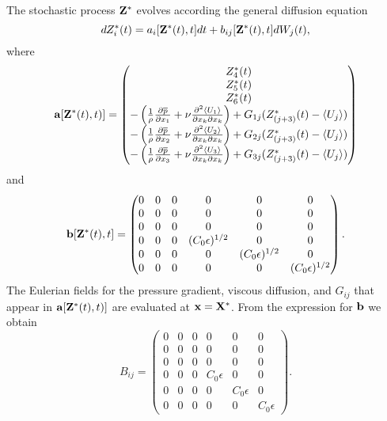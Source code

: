 \documentclass[oneside,a4paper,11pt]{report}
\newcommand{\pavg}{\overline{p}}
\newcommand{\ujavg}{\langle U_j \rangle}
\begin{document}
The stochastic process $\bold{Z}^*$ evolves according the general diffusion equation
\begin{equation}
dZ^*_i(t) = a_i[\bold{Z}^*(t),t] dt + b_{ij}[\bold{Z}^*(t),t] dW_j(t),
\end{equation}
where 
\begin{equation}
\bold{a}[\bold{Z}^*(t),t)] =  \begin{pmatrix}
  Z^*_4(t) \\
  Z^*_5(t)  \\
  Z^*_6(t) \\
-\left ( \frac{1}{\rho} \frac{\partial \pavg}{\partial x_1} + \nu \frac{\partial^2 \langle U_1 \rangle}{\partial x_k \partial x_k} \right ) + G_{1j} (Z_{(j+3)}^*(t) - \ujavg) \\
-\left ( \frac{1}{\rho} \frac{\partial \pavg}{\partial x_2} + \nu \frac{\partial^2 \langle U_2 \rangle}{\partial x_k \partial x_k} \right ) + G_{2j} (Z_{(j+3)}^*(t) - \ujavg) \\
-\left ( \frac{1}{\rho} \frac{\partial \pavg}{\partial x_3} + \nu \frac{\partial^2 \langle U_3 \rangle}{\partial x_k \partial x_k} \right ) + G_{3j} (Z_{(j+3)}^*(t) - \ujavg)
 \end{pmatrix}
\end{equation}
and
\begin{equation}
\mathbf{b}[\bold{Z}^*(t),t] = \begin{pmatrix}
  0 & 0 & 0 & 0 & 0 & 0 \\
  0 & 0 & 0 & 0 & 0 & 0 \\
  0 & 0 & 0 & 0 & 0 & 0 \\
  0 & 0 & 0 & (C_0 \epsilon)^{1/2}  & 0 & 0 \\
  0 & 0 & 0 & 0 & (C_0 \epsilon)^{1/2}  & 0 \\
  0 & 0 & 0 & 0 & 0 & (C_0 \epsilon)^{1/2} 
 \end{pmatrix}.
\end{equation}
The Eulerian fields for the pressure gradient, viscous diffusion, and $G_{ij}$ that appear in $\mathbf{a}[\mathbf{Z}^*(t),t)]$ are evaluated at $\mathbf{x} = \mathbf{X}^*$. From the expression for $\mathbf{b}$ we obtain
\begin{equation}
B_{ij} = \begin{pmatrix}
  0 & 0 & 0 & 0 & 0 & 0 \\
  0 & 0 & 0 & 0 & 0 & 0 \\
  0 & 0 & 0 & 0 & 0 & 0 \\
  0 & 0 & 0 & C_0 \epsilon  & 0 & 0 \\
  0 & 0 & 0 & 0 & C_0 \epsilon  & 0 \\
  0 & 0 & 0 & 0 & 0 & C_0 \epsilon
 \end{pmatrix}.
\end{equation}
\end{document}
